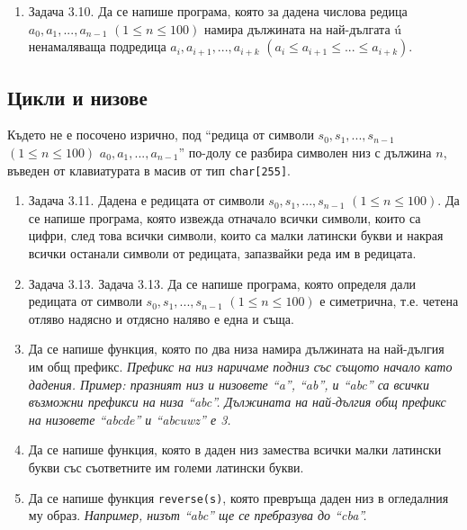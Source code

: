 \documentclass[12pt,a4paper]{article}
\newcommand{\code}[1]{\texttt{#1}}
\begin{document}
{\begin{enumerate}[resume]
		\item Задача 3.10. \cite{sbornik} Да се напише програма, която за дадена числова редица $a_0, a_1, ..., a_{n-1}$ $(1 \leq n \leq 100)$ намира дължината на най-дългата ú ненамаляваща подредица $a_i, a_{i+1}, ..., a_{i+k}$ $(a_i \leq a_{i+1} \leq ... \leq a_{i+k})$.


\end{enumerate}

\subsection {Цикли и низове}
Където не е посочено изрично, под ``редица от символи $s_0, s_1, ..., s_{n-1}$ $(1 \leq n \leq 100)$ $a_0, a_1, ..., a_{n-1}$'' по-долу се разбира символен низ с дължина $n$, въведен от клавиатурата в масив от тип \code{char[255]}.

\begin{enumerate}[resume]


  \item Задача 3.11. \cite{sbornik}	Дадена е редицата от символи $s_0, s_1, ..., s_{n-1}$ $(1 \leq n \leq 100)$. Да се напише програма, която извежда отначало всички символи, които са цифри, след това всички символи, които са малки латински букви и накрая всички останали символи от редицата, запазвайки реда им в редицата.

	\item Задача 3.13. \cite{sbornik} Задача 3.13. Да се напише програма, която определя дали редицата от символи $s_0, s_1, ..., s_{n-1}$ $(1 \leq n \leq 100)$ е симетрична, т.е. четена отляво надясно и отдясно наляво е една и съща.

  \item Да се напише функция, която по два низа намира дължината на най-дългия им общ префикс. \textit{Префикс на низ наричаме подниз със същото начало като дадения. Пример: празният низ и низовете ``a'', ``ab'', и ``abc'' са всички възможни префикси на низа ``abc''. Дължината на най-дългия общ префикс на низовете ``abcde'' и ``abcuwz'' е 3.}

  \item Да се напише функция, която в даден низ замества всички малки латински букви със съответните им големи латински букви.

  \item Да се напише функция \code{reverse(s)}, която превръща даден низ в огледалния му образ. \textit{Например, низът ``abc'' ще се пребразува до ``cba''.}


\end{enumerate}}
\end{document}
